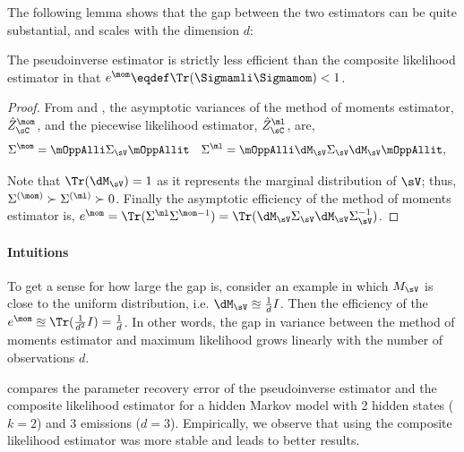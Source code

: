 
The following lemma shows that the gap between the two estimators can be quite substantial,
and scales with the dimension $d$: %
\begin{corollary}
The pseudoinverse estimator is strictly less efficient
than the composite likelihood estimator in that $e^\mom \eqdef \Tr(\Sigmamli \Sigmamom) < 1$.
\end{corollary}
\begin{proof}
  From  and , the asymptotic variances of the method of moments estimator, $\hat Z_\sC^{\mom}$, and the piecewise likelihood estimator, $\hat Z_\sC^{\ml}$, are,
  \begin{align*}
    \Sigma^{\mom} &= \mOppAlli \Sigma_\sV \mOppAllit & \Sigma^{\ml} &= \mOppAlli \dM_\sV \Sigma_\sV \dM_\sV \mOppAllit,
  \end{align*}

  Note that $\Tr(\dM_\sV) = 1$ as it represents the marginal
  distribution of $\sV$; thus, $\Sigma^{(\mom)} \succ \Sigma^{(\ml)}
  \succ 0$.  Finally the asymptotic efficiency of the method of moments
  estimator is, $e^\mom = \Tr( \Sigma^{\ml}\Sigma^{\mom -1} ) = \Tr( \dM_\sV \Sigma_\sV \dM_\sV \Sigma_\sV^{-1} )$.
\end{proof}

\paragraph{Intuitions}
To get a sense for how large the gap is, consider an example in which
$M_\sV$ is close to the uniform distribution, i.e. $\dM_\sV
  \approxeq \frac{1}{d} I$. 
Then the efficiency of the $e^\mom \approxeq \Tr(\frac{1}{d^2} I) = \frac{1}{d}$.
In other words, the gap in variance between the method of moments
  estimator and maximum likelihood grows linearly with the number of observations $d$.

 compares the parameter recovery error of the
  pseudoinverse estimator and the composite likelihood estimator for
  a hidden Markov model with 2 hidden states ($k=2$) and 3 emissions
  ($d=3$).
Empirically, we observe that using the composite likelihood estimator
  was more stable and leads to better results.


